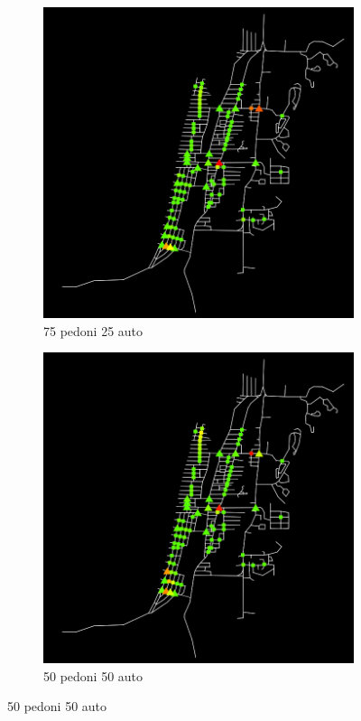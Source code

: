 \begin{figure}
    \centering
    \begin{subfigure}{0.475\textwidth}
        \centering
        \includegraphics[width=\textwidth]{images/analisi/comparison-car-delay-75-25.png}
        \caption{75 pedoni 25 auto}
    \end{subfigure}
    \begin{subfigure}{0.475\textwidth}
        \centering
        \includegraphics[width=\textwidth]{images/analisi/comparison-car-delay-50-50.png}
        \caption{50 pedoni 50 auto}
    \end{subfigure}


\end{figure}
